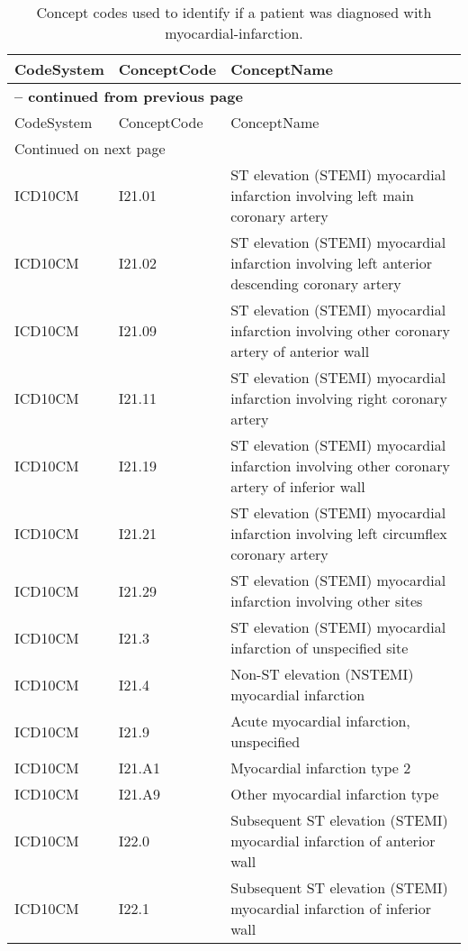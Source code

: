 \begin{longtable}{p{}p{}p{}}
\caption{Concept codes used to identify if a patient was diagnosed with myocardial-infarction.} \\ 
 CodeSystem & ConceptCode & ConceptName \\ 
  \hline 
\endfirsthead 
\multicolumn{3}{p{\textwidth}}{{ \bfseries \tablename \thetable{} -- continued from previous page}} \\ 
\hline CodeSystem & ConceptCode & ConceptName \\ \hline 
\endhead 
\hline \multicolumn{3}{p{\textwidth}}{{Continued on next page}} \\ \hline 
\endfoot 
\hline 
\endlastfoot 
 \hline
ICD10CM & I21.01 & ST elevation (STEMI) myocardial infarction involving left main coronary artery \\ 
  ICD10CM & I21.02 & ST elevation (STEMI) myocardial infarction involving left anterior descending coronary artery \\ 
  ICD10CM & I21.09 & ST elevation (STEMI) myocardial infarction involving other coronary artery of anterior wall \\ 
  ICD10CM & I21.11 & ST elevation (STEMI) myocardial infarction involving right coronary artery \\ 
  ICD10CM & I21.19 & ST elevation (STEMI) myocardial infarction involving other coronary artery of inferior wall \\ 
  ICD10CM & I21.21 & ST elevation (STEMI) myocardial infarction involving left circumflex coronary artery \\ 
  ICD10CM & I21.29 & ST elevation (STEMI) myocardial infarction involving other sites \\ 
  ICD10CM & I21.3 & ST elevation (STEMI) myocardial infarction of unspecified site \\ 
  ICD10CM & I21.4 & Non-ST elevation (NSTEMI) myocardial infarction \\ 
  ICD10CM & I21.9 & Acute myocardial infarction, unspecified \\ 
  ICD10CM & I21.A1 & Myocardial infarction type 2 \\ 
  ICD10CM & I21.A9 & Other myocardial infarction type \\ 
  ICD10CM & I22.0 & Subsequent ST elevation (STEMI) myocardial infarction of anterior wall \\ 
  ICD10CM & I22.1 & Subsequent ST elevation (STEMI) myocardial infarction of inferior wall \\ 

\end{longtable}
